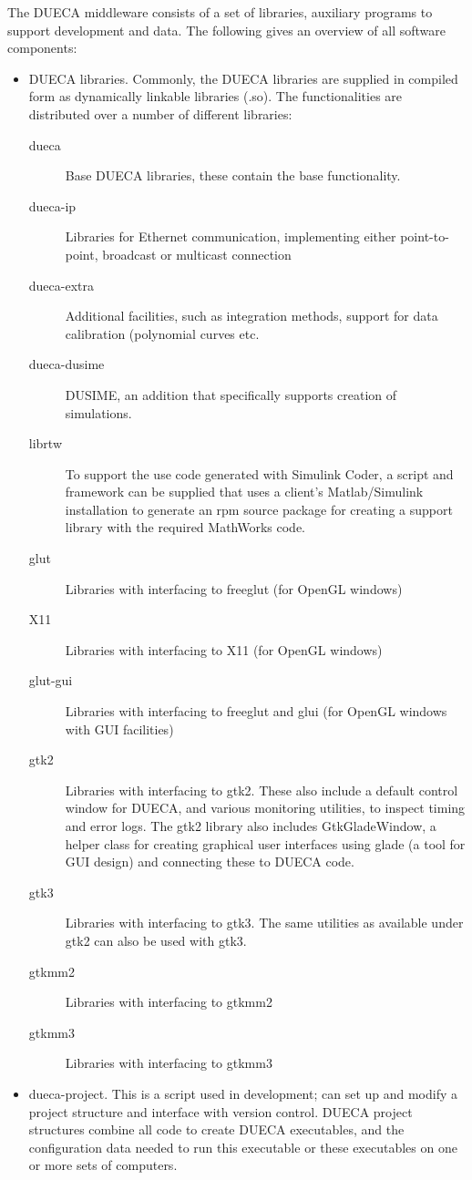 \documentclass[11pt,a4paper,twoside]{scrartcl}
\begin{document}
The DUECA middleware consists of a set of libraries, auxiliary programs to support development and data. The following gives an overview of all software components:

\begin{itemize}
\item DUECA libraries. Commonly, the DUECA libraries are supplied in compiled form as dynamically linkable libraries (.so). The functionalities are distributed over a number of different libraries:
\begin{description}
\item[dueca] Base DUECA libraries, these contain the base functionality.
\item[dueca-ip] Libraries for Ethernet communication, implementing either point-to-point, broadcast or multicast connection
\item[dueca-extra] Additional facilities, such as integration methods, support for data calibration (polynomial curves etc.
\item[dueca-dusime] DUSIME, an addition that specifically supports creation of simulations.
\item[librtw] To support the use code generated with Simulink Coder, a script and framework can be supplied that uses a client's Matlab/Simulink installation to generate an rpm source package for creating a support library with the required MathWorks code.
\item[glut] Libraries with interfacing to freeglut (for OpenGL windows)
\item[X11] Libraries with interfacing to X11 (for OpenGL windows)
\item[glut-gui] Libraries with interfacing to freeglut and glui (for OpenGL windows with GUI facilities)
\item[gtk2] Libraries with interfacing to gtk2. These also include a default control window for DUECA, and various monitoring utilities, to inspect timing and error logs. The gtk2 library also includes GtkGladeWindow, a helper class for creating graphical user interfaces using glade (a tool for GUI design) and connecting these to DUECA code.
\item[gtk3] Libraries with interfacing to gtk3. The same utilities as available under gtk2 can also be used with gtk3.
\item[gtkmm2] Libraries with interfacing to gtkmm2
\item[gtkmm3] Libraries with interfacing to gtkmm3
\end{description}
\item dueca-project. This is a script used in development; can set up and modify a project structure and interface with version control. DUECA project structures combine all code to create DUECA executables, and the configuration data needed to run this executable or these executables on one or more sets of computers.

\end{itemize}
\end{document}
